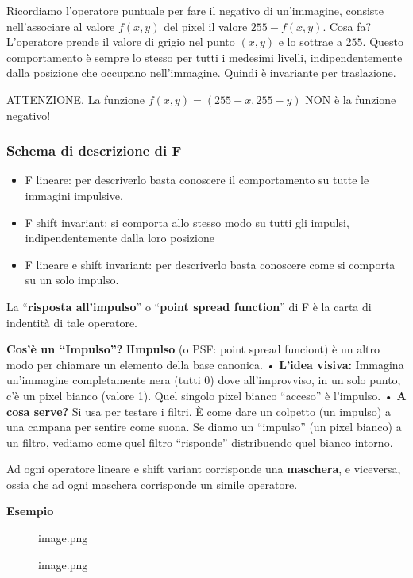 \documentclass[
]{article}
\providecommand{\tightlist}{%
  \setlength{\itemsep}{0pt}\setlength{\parskip}{0pt}}
\begin{document}
Ricordiamo l'operatore puntuale per fare il negativo di un'immagine, consiste nell'associare al valore \(f(x,y)\) del pixel il valore \(255-f(x,y)\).
Cosa fa? L'operatore prende il valore di grigio nel punto \((x,y)\) e lo sottrae a \(255\). Questo comportamento è sempre lo stesso per tutti i medesimi livelli, indipendentemente dalla posizione che occupano nell'immagine. Quindi è invariante per traslazione.

ATTENZIONE. La funzione \(f(x,y)=(255-x,255-y)\) NON è la funzione negativo!

\hypertarget{schema-di-descrizione-di-f}{%
\subsubsection{Schema di descrizione di F}\label{schema-di-descrizione-di-f}}

\begin{itemize}
\tightlist
\item
  F lineare: per descriverlo basta conoscere il comportamento su tutte le immagini impulsive.
\item
  F shift invariant: si comporta allo stesso modo su tutti gli impulsi, indipendentemente dalla loro posizione
\item
  F lineare e shift invariant: per descriverlo basta conoscere come si comporta su un solo impulso.
\end{itemize}

La ``\textbf{risposta all'impulso}'' o ``\textbf{point spread function}'' di F è la carta di indentità di tale operatore.

\textbf{Cos'è un ``Impulso''?}
I\textbf{Impulso} (o PSF: point spread funciont) è un altro modo per chiamare un elemento della base canonica.
• \textbf{L'idea visiva:} Immagina un'immagine completamente nera (tutti 0) dove all'improvviso, in un solo punto, c'è un pixel bianco (valore 1). Quel singolo pixel bianco ``acceso'' è l'impulso.
• \textbf{A cosa serve?} Si usa per testare i filtri. È come dare un colpetto (un impulso) a una campana per sentire come suona. Se diamo un ``impulso'' (un pixel bianco) a un filtro, vediamo come quel filtro ``risponde'' distribuendo quel bianco intorno.

Ad ogni operatore lineare e shift variant corrisponde una \textbf{maschera}, e viceversa, ossia che ad ogni maschera corrisponde un simile operatore.

\textbf{Esempio}

\begin{figure}
\centering
{image.png}
\caption{image.png}
\end{figure}
\end{document}
